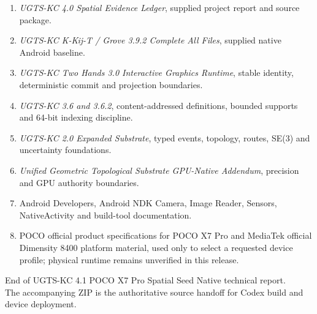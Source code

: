 \documentclass[10.5pt,a4paper]{article}
\begin{document}
{\small
\begin{enumerate}[itemsep=0pt,topsep=1pt,parsep=0pt]
\item \textit{UGTS-KC 4.0 Spatial Evidence Ledger}, supplied project report and source package.
\item \textit{UGTS-KC K-Kij-T / Grove 3.9.2 Complete All Files}, supplied native Android baseline.
\item \textit{UGTS-KC Two Hands 3.0 Interactive Graphics Runtime}, stable identity, deterministic commit and projection boundaries.
\item \textit{UGTS-KC 3.6 and 3.6.2}, content-addressed definitions, bounded supports and 64-bit indexing discipline.
\item \textit{UGTS-KC 2.0 Expanded Substrate}, typed events, topology, routes, SE(3) and uncertainty foundations.
\item \textit{Unified Geometric Topological Substrate GPU-Native Addendum}, precision and GPU authority boundaries.
\item Android Developers, Android NDK Camera, Image Reader, Sensors, NativeActivity and build-tool documentation.
\item POCO official product specifications for POCO X7 Pro and MediaTek official Dimensity 8400 platform material, used only to select a requested device profile; physical runtime remains unverified in this release.
\end{enumerate}
}

\vfill
\begin{center}
\color{muted}\small
End of UGTS-KC 4.1 POCO X7 Pro Spatial Seed Native technical report.\\
The accompanying ZIP is the authoritative source handoff for Codex build and device deployment.
\end{center}
\end{document}

